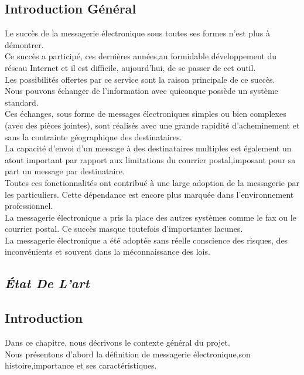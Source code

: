 \documentclass[french]{report}
\begin{document}
\baselineskip=2.0pt
\begin{center}
\section*{\huge Introduction Général}
\end{center}
\thispagestyle{empty}
\par
\LARGE Le succès de la messagerie électronique sous toutes ses formes n'est plus à démontrer. \\
Ce succès a participé, ces dernières années,au formidable développement du réseau Internet et il est difficile, aujourd'hui, de se passer de cet outil.\\ 
Les possibilités offertes par ce service sont la raison principale de ce succès.\\ 
Nous pouvons échanger de l'information avec quiconque possède un système standard.\\
Ces échanges, sous forme de messages électroniques simples ou bien complexes (avec des pièces jointes), sont réalisés avec une grande rapidité d'acheminement et sans la contrainte géographique des destinataires.\\
La capacité d'envoi d'un message à des destinataires multiples est également un atout important par rapport aux limitations du courrier postal,imposant pour sa part un message par destinataire.\\
Toutes ces fonctionnalités ont contribué à une large adoption de la messagerie par les particuliers. 
Cette dépendance est encore plus marquée dans l'environnement professionnel.\\
La messagerie électronique a pris la place des autres systèmes comme le fax ou le courrier postal.
Ce succès masque toutefois d'importantes lacunes.\\
La messagerie électronique a été adoptée sans réelle conscience des risques, des inconvénients et souvent dans la méconnaissance des lois.\\
\begin{titlepage}
\chapter{
\textit{ État De L'art }
 }

\end{titlepage}
\renewcommand*{\thepage}{\arabic{page}}%
\setcounter{page}{2}%
\newpage
\section{\LARGE Introduction}     
\LARGE Dans ce chapitre, nous décrivons le contexte général du projet. \\Nous présentons d’abord la définition de messagerie électronique,son histoire,importance et ses caractéristiques. 
\end{document}
